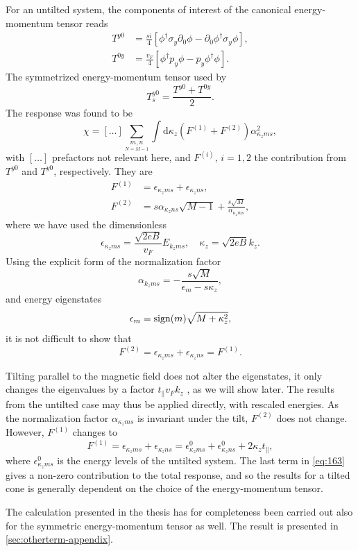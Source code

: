 For an untilted system, the components of interest of the canonical energy-momentum tensor reads
\begin{subequations}
\begin{align}
  T^{y 0} &= \frac{s i}{4}
  \left[
  \phi^{\dagger} \sigma_y \partial_{0} \phi - \partial_0 \phi^{\dagger} \sigma_y \phi
  \right],\\
  T^{0 y} &= \frac{v_F}{4}
  \left[
  \phi^{\dagger} p_y \phi - p_y \phi^{\dagger} \phi
  \right].
\end{align}
\end{subequations}
The symmetrized energy-momentum tensor used by \textcite{arjonaFingerprintsConformalAnomaly2019}
\begin{equation}
  T_s^{y 0} = \frac{T^{y 0} + T^{0 y}}{2}.
\end{equation}
The response was found to be
\begin{equation}
  \chi = [\dots] \sum\limits_{\underset{N=M-1}{m,n}}^{} \int \mathrm{d} \kappa_z (F^{(1)} + F^{(2)}) \alpha_{\kappa_z m s}^2,
\end{equation}
with \( [\dots] \) prefactors not relevant here, and \( F^{(i)},\, i=1,2 \) the contribution from \( T^{y0} \) and \( T^{y 0} \), respectively.
They are
\begin{align}
  F^{(1)} &= \epsilon_{\kappa_z m s} + \epsilon_{\kappa_z n s},\\
  F^{(2)} &= s \alpha_{\kappa_z n s} \sqrt{M-1} + \frac{s \sqrt{M}}{\alpha_{\kappa_z m s}},
\end{align}
where we have used the dimensionless
\[
  \epsilon_{\kappa_z m s} = \frac{\sqrt{2eB}}{v_{F}} E_{k_z m s}, \quad \kappa_z = \sqrt{2 e B} k_z.
\]
Using the explicit form of the normalization factor
\[
  \alpha_{k_z m s} = - \frac{s \sqrt{M}}{\epsilon_{m} - s \kappa_z},
\]
and energy eigenstates
\[
  \epsilon_m = \operatorname{sign} (m) \sqrt{M + \kappa_{z}^2},
\]
it is not difficult to show that
\begin{equation}
  F^{(2)} = \epsilon_{\kappa_z m s} + \epsilon_{\kappa_z n s} = F^{(1)}.
\end{equation}

Tilting parallel to the magnetic field does not alter the eigenstates, it only changes the eigenvalues by a factor \( t_{\parallel} v_F k_z \) \cites{yuPredictedUnusualMagnetoresponse2016,tchoumakovMagneticFieldInducedRelativisticProperties2016}, as we will show later.
The results from the untilted case may thus be applied directly, with rescaled energies.
As the normalization factor \( \alpha_{\kappa_z m s} \) is invariant under the tilt, \( F^{(2)} \) does not change.
However, \( F^{(1)} \) changes to
\begin{equation}
  \label{eq:163}
  F^{(1)} = \epsilon_{\kappa_z m s} + \epsilon_{\kappa_z n s} = \epsilon^0_{\kappa_z m s} + \epsilon^0_{\kappa_z n s} + 2 \kappa_z t_{\parallel},
\end{equation}
where \( \epsilon^0_{\kappa_z m s} \) is the energy levels of the untilted system.
The last term in \cref{eq:163} gives a non-zero contribution to the total response, and so the results for a tilted cone is generally dependent on the choice of the energy-momentum tensor.

The calculation presented in the thesis has for completeness been carried out also for the symmetric energy-momentum tensor as well.
The result is presented in \cref{sec:otherterm-appendix}.


